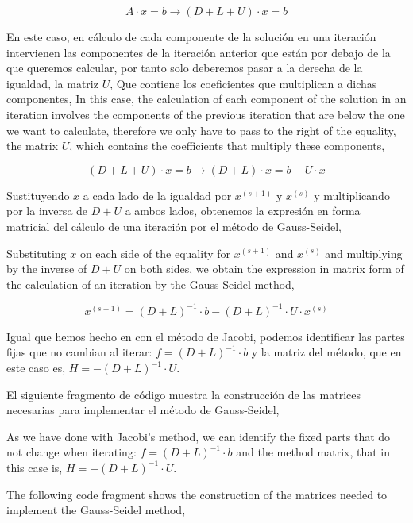 \begin{equation*}
A\cdot x =b \rightarrow (D+L+U)\cdot x=b
\end{equation*}  

\begin{paracol}{2}
En este caso, en cálculo de cada componente de la solución en una iteración intervienen las componentes de la iteración anterior que están por debajo de la que queremos calcular, por tanto solo deberemos pasar a la derecha de la igualdad, la matriz $U$, Que contiene los coeficientes que multiplican a dichas componentes,
\switchcolumn
In this case, the calculation of each component of the solution in an iteration involves the components of the previous iteration that are below the one we want to calculate, therefore we only have to pass to the right of the equality, the matrix $U$, which contains the coefficients that multiply these components,
\end{paracol}

\begin{equation*}
(D+L+U)\cdot x=b \rightarrow (D+L)\cdot x= b-U\cdot x
\end{equation*}

\begin{paracol}{2}
    
Sustituyendo $x$ a cada lado de la igualdad por $x^{(s+1)}$ y $x^{(s)}$ y multiplicando por la inversa de $D+U$ a ambos lados, obtenemos la expresión en forma matricial del cálculo de una iteración por el método de Gauss-Seidel,

\switchcolumn

Substituting $x$ on each side of the equality for $x^{(s+1)}$ and $x^{(s)}$ and multiplying by the inverse of $D+U$ on both sides, we obtain the expression in matrix form of the calculation of an iteration by the Gauss-Seidel method,

\end{paracol}

\begin{equation*}
x^{(s+1)}= (D+L)^{-1}\cdot b-(D+L)^{-1}\cdot U\cdot x^{(s)}
\end{equation*}

\begin{paracol}{2}

Igual que hemos hecho en con el método de Jacobi, podemos identificar las partes fijas que no cambian al iterar: $f=(D+L)^{-1}\cdot b$ y la matriz del método, que en este caso es, $H=-(D+L)^{-1}\cdot U$.

El siguiente fragmento de código muestra la construcción de las matrices necesarias para implementar el método de Gauss-Seidel,

\switchcolumn
As we have done with Jacobi's method, we can identify the fixed parts that do not change when iterating:  $f=(D+L)^{-1}\cdot b$ and the method matrix, that in this case is, $H=-(D+L)^{-1}\cdot U$. 

The following code fragment shows the construction of the matrices needed to implement the Gauss-Seidel method,
\end{paracol}

